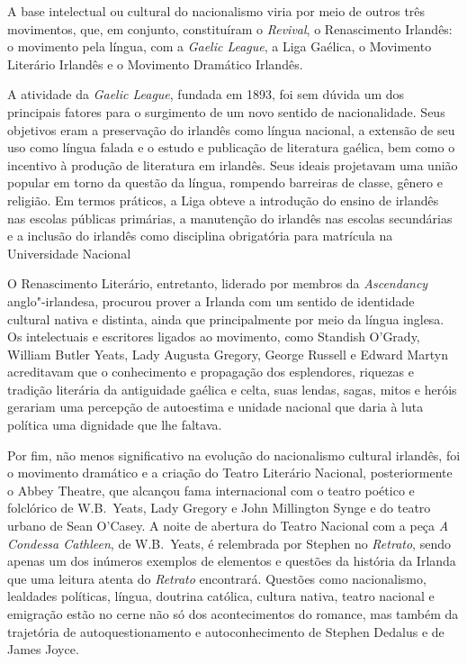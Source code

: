 A base intelectual ou cultural do nacionalismo viria por meio de outros
três movimentos, que, em conjunto, constituíram o \textit{Revival}, o
Renascimento Irlandês: o movimento pela língua, com a \textit{Gaelic
League}, a Liga Gaélica, o Movimento Literário Irlandês e o Movimento
Dramático Irlandês.

A atividade da \textit{Gaelic League}, fundada em 1893, foi sem dúvida
um dos principais fatores para o surgimento de um novo sentido de
nacionalidade. Seus objetivos eram a preservação do irlandês como
língua nacional, a extensão de seu uso como língua falada e o estudo e
publicação de literatura gaélica, bem como o incentivo à produção de
literatura em irlandês. Seus ideais projetavam uma união popular em
torno da questão da língua, rompendo barreiras de classe, gênero e
religião. Em termos práticos, a Liga obteve a introdução do ensino de
irlandês nas escolas públicas primárias, a manutenção do irlandês nas
escolas secundárias e a inclusão do irlandês como disciplina
obrigatória para matrícula na Universidade Nacional

O Renascimento Literário, entretanto, liderado por membros da
\textit{Ascendancy} anglo"-irlandesa, procurou prover a Irlanda com um
sentido de identidade cultural nativa e distinta, ainda que
principalmente por meio da língua inglesa. Os intelectuais e escritores
ligados ao movimento, como Standish O’Grady, William Butler Yeats, Lady
Augusta Gregory, George Russell e Edward Martyn acreditavam que o
conhecimento e propagação dos esplendores, riquezas e tradição
literária da antiguidade gaélica e celta, suas lendas, sagas, mitos e
heróis gerariam uma percepção de autoestima e unidade nacional que
daria à luta política uma dignidade que lhe faltava. 

Por fim, não menos significativo na evolução do nacionalismo cultural
irlandês, foi o movimento dramático e a criação do Teatro Literário
Nacional, posteriormente o Abbey Theatre, que alcançou fama
internacional com o teatro poético e folclórico de W.B.~Yeats, Lady
Gregory e John Millington Synge e do teatro urbano de Sean O’Casey. A
noite de abertura do Teatro Nacional com a peça \textit{A Condessa
Cathleen}, de W.B.~Yeats, é relembrada por Stephen no \textit{Retrato},
sendo apenas um dos inúmeros exemplos de elementos e questões
da história da Irlanda que uma leitura atenta do \textit{Retrato}
encontrará. Questões como nacionalismo, lealdades políticas, língua,
doutrina católica, cultura nativa, teatro nacional e emigração estão no
cerne não só dos acontecimentos do romance, mas também da trajetória de
autoquestionamento e autoconhecimento de Stephen Dedalus e de James
Joyce.  


